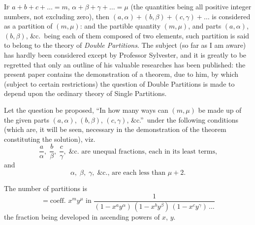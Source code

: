\documentclass[11pt,a4paper]{book}
\begin{document}

\textsc{If} $a+b+c+\ldots = m$, $\alpha+\beta+\gamma+\ldots = \mu$ (the quantities being all positive integer numbers, not excluding zero), then $(a,\alpha)+(b,\beta)+(c,\gamma)+\ldots$ is considered as a partition of $(m,\mu)$: and the partible quantity $(m,\mu)$, and parts $(a,\alpha)$, $(b,\beta)$, \&c.\ being each of them composed of two elements, such partition is said to belong to the theory of \textit{Double Partitions}. The subject (so far as I am aware) has hardly been considered except by Professor Sylvester, and it is greatly to be regretted that only an outline of his valuable researches has been published: the present paper contains the demonstration of a theorem, due to him, by which (subject to certain restrictions) the question of Double Partitions is made to depend upon the ordinary theory of Single Partitions.

Let the question be proposed, ``In how many ways can $(m,\mu)$ be made up of the given parts $(a,\alpha)$, $(b,\beta)$, $(c,\gamma)$, \&c.''\ under the following conditions (which are, it will be seen, necessary in the demonstration of the theorem constituting the solution), viz.
\[
\frac{a}{\alpha},\; \frac{b}{\beta},\; \frac{c}{\gamma},\; \text{\&c.\ are unequal fractions, each in its least terms,}
\]
and
\[
\alpha,\; \beta,\; \gamma,\; \text{\&c., are each less than $\mu+2$.}
\]

The number of partitions is
\[
= \text{coeff.\ } x^m y^\mu \text{\ in\ } \frac{1}{(1-x^a y^\alpha)\,(1-x^b y^\beta)\,(1-x^c y^\gamma)\,\ldots}
\]
the fraction being developed in ascending powers of $x$, $y$.


\end{document}
